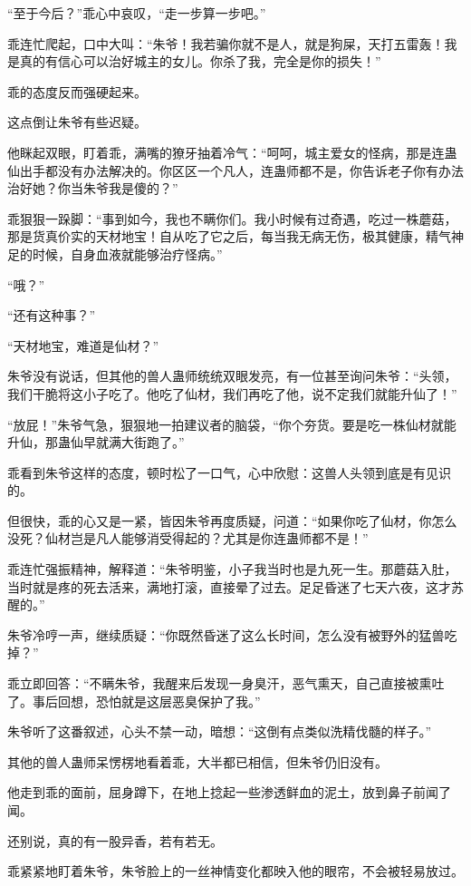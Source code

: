 \begin{this_body}
“至于今后？”乖心中哀叹，“走一步算一步吧。”

乖连忙爬起，口中大叫：“朱爷！我若骗你就不是人，就是狗屎，天打五雷轰！我是真的有信心可以治好城主的女儿。你杀了我，完全是你的损失！”

乖的态度反而强硬起来。

这点倒让朱爷有些迟疑。

他眯起双眼，盯着乖，满嘴的獠牙抽着冷气：“呵呵，城主爱女的怪病，那是连蛊仙出手都没有办法解决的。你区区一个凡人，连蛊师都不是，你告诉老子你有办法治好她？你当朱爷我是傻的？”

乖狠狠一跺脚：“事到如今，我也不瞒你们。我小时候有过奇遇，吃过一株蘑菇，那是货真价实的天材地宝！自从吃了它之后，每当我无病无伤，极其健康，精气神足的时候，自身血液就能够治疗怪病。”

“哦？”

“还有这种事？”

“天材地宝，难道是仙材？”

朱爷没有说话，但其他的兽人蛊师统统双眼发亮，有一位甚至询问朱爷：“头领，我们干脆将这小子吃了。他吃了仙材，我们再吃了他，说不定我们就能升仙了！”

“放屁！”朱爷气急，狠狠地一拍建议者的脑袋，“你个夯货。要是吃一株仙材就能升仙，那蛊仙早就满大街跑了。”

乖看到朱爷这样的态度，顿时松了一口气，心中欣慰：这兽人头领到底是有见识的。

但很快，乖的心又是一紧，皆因朱爷再度质疑，问道：“如果你吃了仙材，你怎么没死？仙材岂是凡人能够消受得起的？尤其是你连蛊师都不是！”

乖连忙强振精神，解释道：“朱爷明鉴，小子我当时也是九死一生。那蘑菇入肚，当时就是疼的死去活来，满地打滚，直接晕了过去。足足昏迷了七天六夜，这才苏醒的。”

朱爷冷哼一声，继续质疑：“你既然昏迷了这么长时间，怎么没有被野外的猛兽吃掉？”

乖立即回答：“不瞒朱爷，我醒来后发现一身臭汗，恶气熏天，自己直接被熏吐了。事后回想，恐怕就是这层恶臭保护了我。”

朱爷听了这番叙述，心头不禁一动，暗想：“这倒有点类似洗精伐髓的样子。”

其他的兽人蛊师呆愣楞地看着乖，大半都已相信，但朱爷仍旧没有。

他走到乖的面前，屈身蹲下，在地上捻起一些渗透鲜血的泥土，放到鼻子前闻了闻。

还别说，真的有一股异香，若有若无。

乖紧紧地盯着朱爷，朱爷脸上的一丝神情变化都映入他的眼帘，不会被轻易放过。


\end{this_body}
